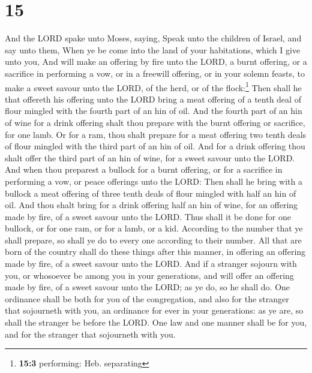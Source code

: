 \hypertarget{section-14}{%
\section{15}\label{section-14}}

 And the LORD spake unto Moses, saying, 
Speak unto the children of Israel, and say unto them, When ye be come
into the land of your habitations, which I give unto you, 
And will make an offering by fire unto the LORD, a burnt offering, or a
sacrifice in performing a vow, or in a freewill offering, or in your
solemn feasts, to make a sweet savour unto the LORD, of the herd, or of
the flock:\footnote{\textbf{15:3} performing: Heb. separating}
 Then shall he that offereth his offering unto the LORD
bring a meat offering of a tenth deal of flour mingled with the fourth
part of an hin of oil.  And the fourth part of an hin of
wine for a drink offering shalt thou prepare with the burnt offering or
sacrifice, for one lamb.  Or for a ram, thou shalt prepare
for a meat offering two tenth deals of flour mingled with the third part
of an hin of oil.  And for a drink offering thou shalt
offer the third part of an hin of wine, for a sweet savour unto the
LORD.  And when thou preparest a bullock for a burnt
offering, or for a sacrifice in performing a vow, or peace offerings
unto the LORD:  Then shall he bring with a bullock a meat
offering of three tenth deals of flour mingled with half an hin of oil.
 And thou shalt bring for a drink offering half an hin of
wine, for an offering made by fire, of a sweet savour unto the LORD.
 Thus shall it be done for one bullock, or for one ram,
or for a lamb, or a kid.  According to the number that ye
shall prepare, so shall ye do to every one according to their number.
 All that are born of the country shall do these things
after this manner, in offering an offering made by fire, of a sweet
savour unto the LORD.  And if a stranger sojourn with
you, or whosoever be among you in your generations, and will offer an
offering made by fire, of a sweet savour unto the LORD; as ye do, so he
shall do.  One ordinance shall be both for you of the
congregation, and also for the stranger that sojourneth with you, an
ordinance for ever in your generations: as ye are, so shall the stranger
be before the LORD.  One law and one manner shall be for
you, and for the stranger that sojourneth with you.


